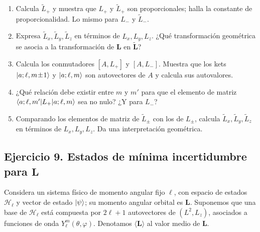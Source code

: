 \documentclass[a4paper,11pt]{article}
\begin{document}
\begin{enumerate}
	\item Calcula $\tilde L_+$ y muestra que $L_+$ y $\tilde L_+$ son proporcionales; halla la constante de proporcionalidad. Lo mismo para $L_-$ y $\tilde L_-$.
	\item Expresa $\tilde L_x,\tilde L_y,\tilde L_z$ en términos de $L_x,L_y,L_z$. ¿Qué transformación geométrica se asocia a la transformación de $\mathbf{L}$ en $\tilde{\mathbf{L}}$?
	\item Calcula los conmutadores $[A,L_+]$ y $[A,L_-]$. Muestra que los kets $\ket{a;\ell,m\!\pm\!1}$ y $\ket{a;\ell,m}$ son autovectores de $A$ y calcula sus autovalores.
	\item ¿Qué relación debe existir entre $m$ y $m'$ para que el elemento de matriz $\braket{a;\ell,m'|L_+|a;\ell,m}$ sea no nulo? ¿Y para $L_-$?
	\item Comparando los elementos de matriz de $\tilde L_\pm$ con los de $L_\pm$, calcula $\tilde L_x,\tilde L_y,\tilde L_z$ en términos de $L_x,L_y,L_z$. Da una interpretación geométrica.
\end{enumerate}

\subsection*{Ejercicio 9. Estados de mínima incertidumbre para $\mathbf{L}$}
Considera un sistema físico de momento angular fijo $\ell$, con espacio de estados $\mathcal{H}_\ell$ y vector de estado $\ket{\psi}$; su momento angular orbital es $\mathbf{L}$. Suponemos que una base de $\mathcal{H}_\ell$ está compuesta por $2\ell+1$ autovectores de $(L^2,L_z)$, asociados a funciones de onda $Y_\ell^{m}(\theta,\varphi)$. Denotamos $\langle\mathbf{L}\rangle$ al valor medio de $\mathbf{L}$.
\end{document}
